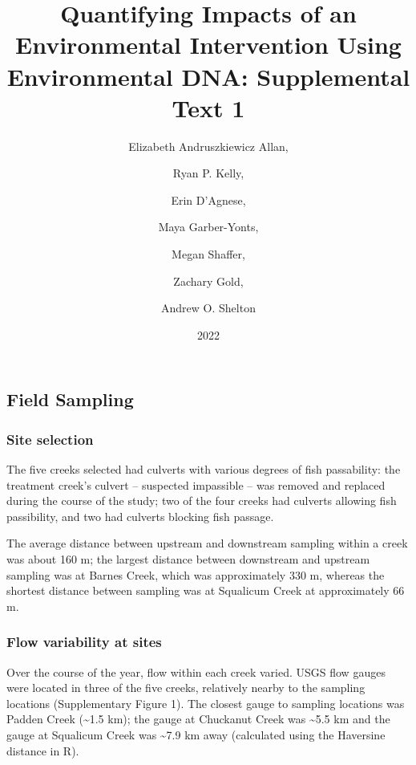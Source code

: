 \documentclass[
]{article}
\title{Quantifying Impacts of an Environmental Intervention Using
Environmental DNA: Supplemental Text 1}
\author{Elizabeth Andruszkiewicz Allan, \and Ryan P. Kelly, \and Erin
D'Agnese, \and Maya Garber-Yonts, \and Megan Shaffer, \and Zachary
Gold, \and Andrew O. Shelton}
\date{2022}
\begin{document}
\maketitle

\hypertarget{field-sampling}{%
\subsection{Field Sampling}\label{field-sampling}}

\hypertarget{site-selection}{%
\subsubsection{Site selection}\label{site-selection}}

The five creeks selected had culverts with various degrees of fish
passability: the treatment creek's culvert -- suspected impassible --
was removed and replaced during the course of the study; two of the four
creeks had culverts allowing fish passibility, and two had culverts
blocking fish passage.

The average distance between upstream and downstream sampling within a
creek was about 160 m; the largest distance between downstream and
upstream sampling was at Barnes Creek, which was approximately 330 m,
whereas the shortest distance between sampling was at Squalicum Creek at
approximately 66 m.

\hypertarget{flow-variability-at-sites}{%
\subsubsection{Flow variability at
sites}\label{flow-variability-at-sites}}

Over the course of the year, flow within each creek varied. USGS flow
gauges were located in three of the five creeks, relatively nearby to
the sampling locations (Supplementary Figure 1). The closest gauge to
sampling locations was Padden Creek (\textasciitilde1.5 km); the gauge
at Chuckanut Creek was \textasciitilde5.5 km and the gauge at Squalicum
Creek was \textasciitilde7.9 km away (calculated using the Haversine
distance in R).
\end{document}
